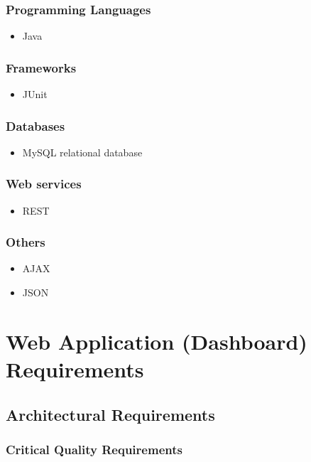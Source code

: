 \documentclass[hidelinks, 12pt, oneside]{article}
\begin{document}
	\subsubsection{Programming Languages}
	\begin{itemize}
	\item Java
	\end{itemize}
	\subsubsection{Frameworks}
	\begin{itemize}
	\item JUnit
	\end{itemize}
	\subsubsection{Databases}
	\begin{itemize}
	\item MySQL relational database
	\end{itemize}
	\subsubsection{Web services}
	\begin{itemize}
	\item REST
	\end{itemize}
	\subsubsection{Others}
	\begin{itemize}
	\item AJAX
	\item JSON
	\end{itemize}		
	
\newpage
\section{Web Application (Dashboard) Requirements}
\subsection{Architectural Requirements}
		\subsubsection{Critical Quality Requirements} 
\end{document}
